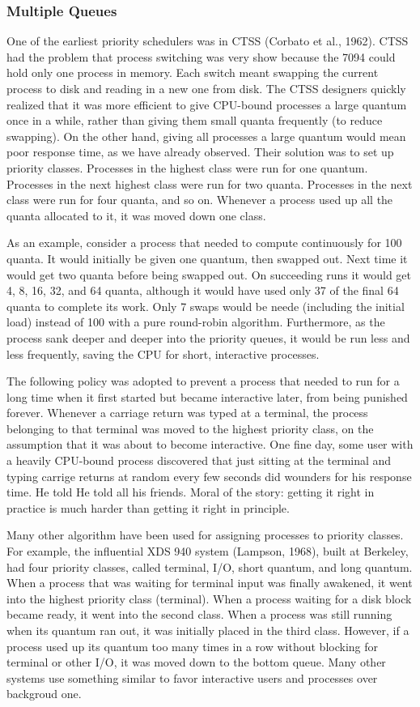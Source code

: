 \documentclass{book}
\begin{document}
\subsubsection*{Multiple Queues}
One of the earliest priority schedulers was in CTSS (Corbato et al., 1962).
CTSS had the problem that process switching was very show because the 7094 could hold only one process in memory.
Each switch meant swapping the current process to disk and reading in a new one from disk.
The CTSS designers quickly realized that it was more efficient to give CPU-bound processes a large quantum once in a while,
rather than giving them small quanta frequently (to reduce swapping).
On the other hand, giving all processes a large quantum would mean poor response time, as we have already observed.
Their solution was to set up priority classes.
Processes in the highest class were run for one quantum.
Processes in the next highest class were run for two quanta.
Processes in the next class were run for four quanta, and so on.
Whenever a process used up all the quanta allocated to it, it was moved down one class.

As an example, consider a process that needed to compute continuously for 100 quanta.
It would initially be given one quantum, then swapped out.
Next time it would get two quanta before being swapped out.
On succeeding runs it would get 4, 8, 16, 32, and 64 quanta, 
although it would have used only 37 of the final 64 quanta to complete its work.
Only 7 swaps would be neede (including the initial load) instead of 100 with a pure round-robin algorithm.
Furthermore, as the process sank deeper and deeper into the priority queues,
it would be run less and less frequently, saving the CPU for short, interactive processes.

The following policy was adopted to prevent a process that needed to run for a long time 
when it first started but became interactive later, from being punished forever.
Whenever a carriage return was typed at a terminal, the process belonging to that terminal was moved to the highest priority class,
on the assumption that it was about to become interactive.
One fine day, some user with a heavily CPU-bound process discovered that just sitting at the terminal and typing carrige returns at random every few seconds did wounders for his response time.
He told He told all his friends.
Moral of the story: getting it right in practice is much harder than getting it right in principle.

Many other algorithm have been used for assigning processes to priority classes.
For example, the influential XDS 940 system (Lampson, 1968), built at Berkeley, 
had four priority classes, called terminal, I/O, short quantum, and long quantum.
When a process that was waiting for terminal input was finally awakened, it went into the highest priority class (terminal).
When a process waiting for a disk block became ready, it went into the second class.
When a process was still running when its quantum ran out, it was initially placed in the third class.
However, if a process used up its quantum too many times in a row without blocking for terminal or other I/O, 
it was moved down to the bottom queue.
Many other systems use something similar to favor interactive users and processes over backgroud one.
\end{document}
